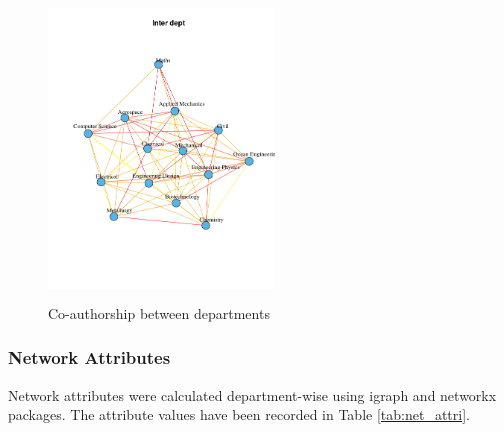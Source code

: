 \documentclass[conference,compsoc]{IEEEtran}
\begin{document}
\begin{figure}[t]
    \centering
    \includegraphics[width=6cm,height=8cm]{inter_dept}
    \caption{Co-authorship between departments}
    \label{fig:interdept}
\end{figure}

\subsubsection*{Network Attributes}

Network attributes were calculated department-wise using igraph and networkx packages. The attribute values have been recorded in Table \ref{tab:net_attri}. 
\end{document}
